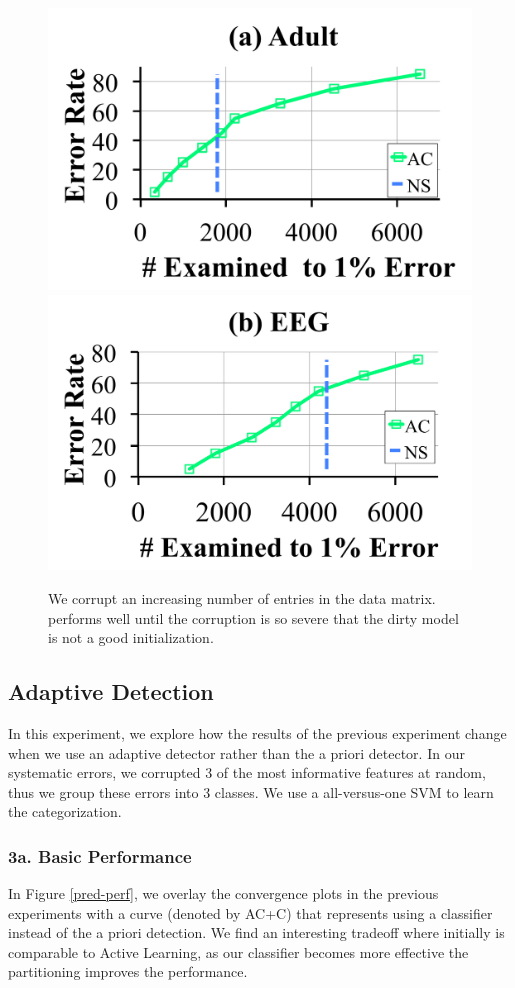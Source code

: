 \begin{figure}[ht!]
\centering
 \includegraphics[width=0.49\columnwidth]{exp/exp9a.pdf}
  \includegraphics[width=0.49\columnwidth]{exp/exp9b.pdf}
 \caption{We corrupt an increasing number of entries in the data matrix. \sys performs well until the corruption is so severe that the dirty model is not a good initialization.  \label{bias}}
\end{figure}

\subsection{Adaptive Detection}
In this experiment, we explore how the results of the previous experiment change when we use an adaptive detector rather than the a priori detector.
In our systematic errors, we corrupted 3 of the most informative features at random, thus we group these errors into 3 classes.
We use a all-versus-one SVM to learn the categorization.

\subsubsection{3a. Basic Performance}
In Figure \ref{pred-perf}, we overlay the convergence plots in the previous experiments with a curve (denoted by AC+C) that represents \sys using a classifier instead of the a priori detection.
We find an interesting tradeoff where initially \sys is comparable to Active Learning, as our classifier becomes more effective the partitioning improves the performance.

